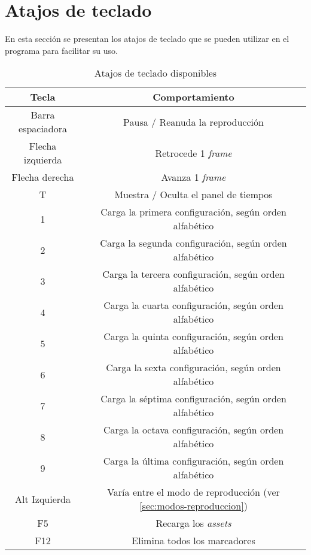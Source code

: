 \chapter{Atajos de teclado} \label{apx:keyboard-shortcut}

En esta sección se presentan los atajos de teclado que se pueden utilizar en el programa para facilitar su uso.

\begin{table}[H]
    \centering
    \caption{Atajos de teclado disponibles}
    \begin{tabular}{c|c}
    \toprule
    {\textbf{Tecla}} & {\textbf{Comportamiento}} \\
    \midrule
    Barra espaciadora & Pausa / Reanuda la reproducción \\
    Flecha izquierda & Retrocede 1 \textit{frame} \\
    Flecha derecha & Avanza 1 \textit{frame} \\
    T & Muestra / Oculta el panel de tiempos \\
    1 & Carga la primera configuración, según orden alfabético \\
    2 & Carga la segunda configuración, según orden alfabético \\
    3 & Carga la tercera configuración, según orden alfabético \\
    4 & Carga la cuarta configuración, según orden alfabético \\
    5 & Carga la quinta configuración, según orden alfabético \\
    6 & Carga la sexta configuración, según orden alfabético \\
    7 & Carga la séptima configuración, según orden alfabético \\
    8 & Carga la octava configuración, según orden alfabético \\
    9 & Carga la última configuración, según orden alfabético \\
    Alt Izquierda & Varía entre el modo de reproducción (ver \ref{sec:modos-reproduccion}) \\
    F5 & Recarga los \textit{assets} \\
    F12 & Elimina todos los marcadores \\
    \bottomrule
    \end{tabular}
    \label{tab:keyboard-shortcut}
  \end{table}